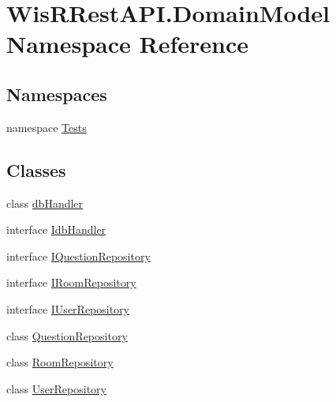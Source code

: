 \hypertarget{namespace_wis_r_rest_a_p_i_1_1_domain_model}{}\section{Wis\+R\+Rest\+A\+P\+I.\+Domain\+Model Namespace Reference}
\label{namespace_wis_r_rest_a_p_i_1_1_domain_model}
\subsection*{Namespaces}
\begin{DoxyCompactItemize}
\item 
namespace \hyperlink{namespace_wis_r_rest_a_p_i_1_1_domain_model_1_1_tests}{Tests}
\end{DoxyCompactItemize}
\subsection*{Classes}
\begin{DoxyCompactItemize}
\item 
class \hyperlink{class_wis_r_rest_a_p_i_1_1_domain_model_1_1db_handler}{db\+Handler}
\item 
interface \hyperlink{interface_wis_r_rest_a_p_i_1_1_domain_model_1_1_idb_handler}{Idb\+Handler}
\item 
interface \hyperlink{interface_wis_r_rest_a_p_i_1_1_domain_model_1_1_i_question_repository}{I\+Question\+Repository}
\item 
interface \hyperlink{interface_wis_r_rest_a_p_i_1_1_domain_model_1_1_i_room_repository}{I\+Room\+Repository}
\item 
interface \hyperlink{interface_wis_r_rest_a_p_i_1_1_domain_model_1_1_i_user_repository}{I\+User\+Repository}
\item 
class \hyperlink{class_wis_r_rest_a_p_i_1_1_domain_model_1_1_question_repository}{Question\+Repository}
\item 
class \hyperlink{class_wis_r_rest_a_p_i_1_1_domain_model_1_1_room_repository}{Room\+Repository}
\item 
class \hyperlink{class_wis_r_rest_a_p_i_1_1_domain_model_1_1_user_repository}{User\+Repository}
\end{DoxyCompactItemize}
